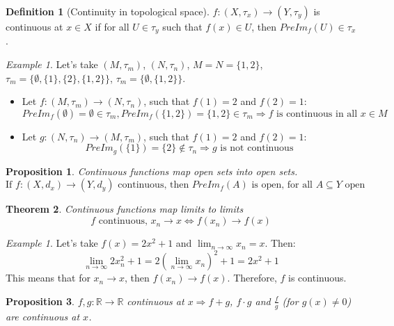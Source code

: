 \documentclass{article}
\newcommand{\DS}{\displaystyle}
\newcommand{\Ar}{\Rightarrow}
\newcommand{\fr}[2]{\frac{#1}{#2}}
\newcommand{\f}[3]{#1 : #2 \rightarrow #3}
\newcommand{\fOnR}[1]{#1 : \mathbb{R} \rightarrow \mathbb{R}}
\newcommand{\limn}{\lim_{n \to \infty}}
\theoremstyle{definition}
\newtheorem{definition}{Definition}[section]
\theoremstyle{definition}
\theoremstyle{plain}
\newtheorem{theorem}{Theorem}[section]
\theoremstyle{plain}
\theoremstyle{plain}
\theoremstyle{plain}
\newtheorem{proposition}[theorem]{Proposition}
\theoremstyle{definition}
\theoremstyle{remark}
\newtheorem{exampled}{Example}[definition]
\theoremstyle{remark}
\theoremstyle{remark}
\newtheorem{examplet}{Example}[theorem]
\theoremstyle{remark}
\begin{document}
\begin{definition}[Continuity in topological space]
  $\f{f}{(X,\tau_x)}{(Y,\tau_y)}$ is continuous at $x \in X$ if for all $U \in \tau_y$ such that $f(x) \in U$, then $PreIm_f(U) \in \tau_x$.
\end{definition}

\begin{exampled}
  Let's take $(M,\tau_m)$, $(N,\tau_n)$, $M = N = \{ 1, 2 \}$, $\tau_m = \{ \emptyset, \{ 1 \}, \{ 2 \}, \{ 1, 2 \} \}$, $\tau_m = \{ \emptyset, \{ 1, 2 \} \}$.
  \begin{itemize}
    \item Let $\f{f}{(M,\tau_m)}{(N,\tau_n)}$, such that $f(1) = 2$ and $f(2) = 1$:
    \[
      PreIm_f(\emptyset) = \emptyset \in \tau_m,
      PreIm_f(\{ 1, 2 \}) = \{ 1, 2 \} \in \tau_m \Ar
      f \text{ is continuous in all } x \in M
    \]
    \item Let $\f{g}{(N,\tau_n)}{(M,\tau_m)}$, such that $f(1) = 2$ and $f(2) = 1$:
    \[
      PreIm_g(\{ 1 \}) = \{ 2 \} \notin \tau_n \Ar g \text{ is not continuous}
    \]
  \end{itemize}
\end{exampled}


\begin{proposition}
  Continuous functions map open sets into open sets.
  \[
  \text{If } \f{f}{(X,d_x)}{(Y,d_y)} \text{ continuous, then } PreIm_f(A) \text{ is open, for all } A \subseteq Y \text{ open}
  \]
\end{proposition}



\begin{theorem}
  Continuous functions map limits to limits
  \[
    f \text{ continuous, } x_n \to x \iff f(x_n) \to f(x)
  \]
\end{theorem}



\begin{examplet}
  Let's take $f(x) = 2x^2 + 1$ and $\DS \limn x_n = x$. Then:
  \[
    \limn 2x_n^2 + 1 = 2 \left(\limn x_n\right)^2 + 1 = 2x^2 + 1
  \]
  This means that for $x_n \to x$, then $f(x_n) \to f(x)$. Therefore, $f$ is continuous.
\end{examplet}


\begin{proposition}
  $\fOnR{f,g}$ continuous at $x \Ar f+g$, $f \cdot g$ and $\fr{f}{g}$ (for $g(x) \neq 0$) are continuous at $x$.
\end{proposition}
\end{document}
